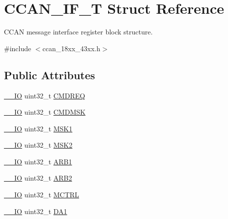 \hypertarget{struct_c_c_a_n___i_f___t}{}\section{C\+C\+A\+N\+\_\+\+I\+F\+\_\+T Struct Reference}
\label{struct_c_c_a_n___i_f___t}


C\+C\+AN message interface register block structure.  




{\ttfamily \#include $<$ccan\+\_\+18xx\+\_\+43xx.\+h$>$}

\subsection*{Public Attributes}
\begin{DoxyCompactItemize}
\item 
\hyperlink{core__sc300_8h_aec43007d9998a0a0e01faede4133d6be}{\+\_\+\+\_\+\+IO} uint32\+\_\+t \hyperlink{struct_c_c_a_n___i_f___t_a2c723b6817fc390287b469e16a8f828e}{C\+M\+D\+R\+EQ}
\item 
\hyperlink{core__sc300_8h_aec43007d9998a0a0e01faede4133d6be}{\+\_\+\+\_\+\+IO} uint32\+\_\+t \hyperlink{struct_c_c_a_n___i_f___t_ac3b55799e4ebd519eb4d3860f4fe3ec6}{C\+M\+D\+M\+SK}
\item 
\hyperlink{core__sc300_8h_aec43007d9998a0a0e01faede4133d6be}{\+\_\+\+\_\+\+IO} uint32\+\_\+t \hyperlink{struct_c_c_a_n___i_f___t_a034a29eef01979bb2e361091cd886304}{M\+S\+K1}
\item 
\hyperlink{core__sc300_8h_aec43007d9998a0a0e01faede4133d6be}{\+\_\+\+\_\+\+IO} uint32\+\_\+t \hyperlink{struct_c_c_a_n___i_f___t_a6e21bcd1d7eb43db030d736e64014116}{M\+S\+K2}
\item 
\hyperlink{core__sc300_8h_aec43007d9998a0a0e01faede4133d6be}{\+\_\+\+\_\+\+IO} uint32\+\_\+t \hyperlink{struct_c_c_a_n___i_f___t_a48de9f54549ad822cf2a764c0664628e}{A\+R\+B1}
\item 
\hyperlink{core__sc300_8h_aec43007d9998a0a0e01faede4133d6be}{\+\_\+\+\_\+\+IO} uint32\+\_\+t \hyperlink{struct_c_c_a_n___i_f___t_a09d45c8fb62c789ea01abf6925d2c10a}{A\+R\+B2}
\item 
\hyperlink{core__sc300_8h_aec43007d9998a0a0e01faede4133d6be}{\+\_\+\+\_\+\+IO} uint32\+\_\+t \hyperlink{struct_c_c_a_n___i_f___t_a1f22576d88eeb7c35f81cc5231f80171}{M\+C\+T\+RL}
\item 
\hyperlink{core__sc300_8h_aec43007d9998a0a0e01faede4133d6be}{\+\_\+\+\_\+\+IO} uint32\+\_\+t \hyperlink{struct_c_c_a_n___i_f___t_a435a452b981137baab3e2f73c5ee1749}{D\+A1}

\end{DoxyCompactItemize}
